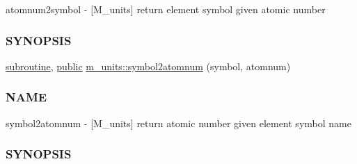 \begin{DoxyCompactItemize}
\begin{DoxyCompactList}
atomnum2symbol -\/ \mbox{[}M\+\_\+units\mbox{]} return element symbol given atomic number \subsubsection*{S\+Y\+N\+O\+P\+S\+IS}\end{DoxyCompactList}\item 
\hyperlink{M__stopwatch_83_8txt_acfbcff50169d691ff02d4a123ed70482}{subroutine}, \hyperlink{M__stopwatch_83_8txt_a2f74811300c361e53b430611a7d1769f}{public} \hyperlink{namespacem__units_ad6861fff0b83942a7e6b35a274bf2e09}{m\+\_\+units\+::symbol2atomnum} (symbol, atomnum)
\begin{DoxyCompactList}\small\item\em \subsubsection*{N\+A\+ME}

symbol2atomnum -\/ \mbox{[}M\+\_\+units\mbox{]} return atomic number given element symbol name \subsubsection*{S\+Y\+N\+O\+P\+S\+IS}\end{DoxyCompactList}\end{DoxyCompactItemize}
